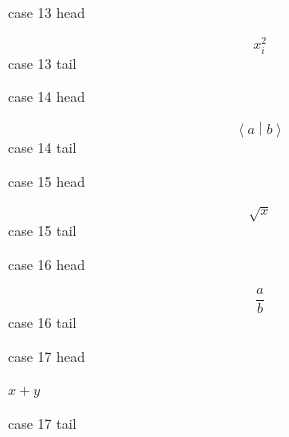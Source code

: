\documentclass[12pt]{article}
\begin{document}
\noindent case 13 head\par
\[ x_i^2 \]
\noindent case 13 tail\par
\noindent case 14 head\par
\[ \left\langle a \middle| b \right\rangle \]
\noindent case 14 tail\par
\noindent case 15 head\par
\[ \sqrt{x} \]
\noindent case 15 tail\par
\noindent case 16 head\par
\[ \textstyle \frac{a}{b} \]
\noindent case 16 tail\par
\noindent case 17 head\par
$x+y$\par
\noindent case 17 tail\par
\end{document}
